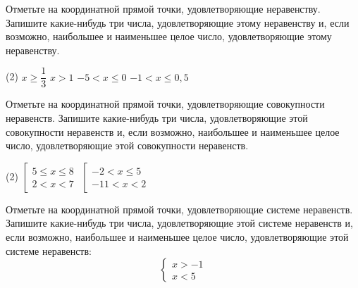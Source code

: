 \begin{homework}[number=1]
	\begin{listofex}
		\item Отметьте на координатной прямой точки, удовлетворяющие неравенству. Запишите какие-нибудь три числа, удовлетворяющие этому неравенству и, если возможно, наибольшее и наименьшее целое число, удовлетворяющие этому неравенству.
		\begin{tasks}(2)
			\task \( x \ge \dfrac{ 1 }{ 3 } \)
			\task \( x > 1 \)
			\task \( -5 < x \le 0 \)
			\task \( -1 < x \le 0,5 \)
		\end{tasks}
		
		
		\item Отметьте на координатной прямой точки, удовлетворяющие совокупности неравенств. Запишите какие-нибудь три числа, удовлетворяющие этой совокупности неравенств и, если возможно, наибольшее и наименьшее целое число, удовлетворяющие этой совокупности неравенств.
		\begin{tasks}(2)
			\task \( \left[
			\begin{array}{l} 5 \le x \le 8 \\ 2 < x < 7 \end{array} \right. \)
			\task \( \left[
			\begin{array}{l} -2<x \le 5 \\ -11 < x < 2 \end{array} \right. \)
		\end{tasks}
		\item Отметьте на координатной прямой точки, удовлетворяющие системе неравенств. Запишите какие-нибудь три числа, удовлетворяющие этой системе неравенств и, если возможно, наибольшее и наименьшее целое число, удовлетворяющие этой системе неравенств: \[ \begin{cases} x > -1 \\ x < 5 \end{cases} \]

\end{listofex}
\end{homework}
